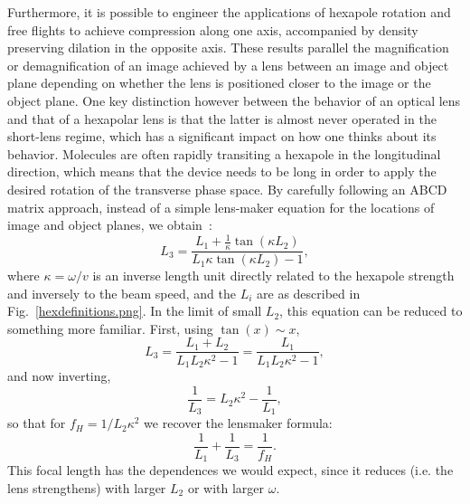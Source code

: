 Furthermore, it is possible to engineer the applications of hexapole rotation and free flights to achieve compression along one axis, accompanied by density preserving dilation in the opposite axis.
These results parallel the magnification or demagnification of an image achieved by a lens between an image and object plane depending on whether the lens is positioned closer to the image or the object plane.
One key distinction however between the behavior of an optical lens and that of a hexapolar lens is that the latter is almost never operated in the short-lens regime, which has a significant impact on how one thinks about its behavior.
Molecules are often rapidly transiting a hexapole in the longitudinal direction, which means that the device needs to be long in order to apply the desired rotation of the transverse phase space.
By carefully following an ABCD matrix approach, instead of a simple lens-maker equation for the locations of image and object planes, we obtain~\citep[Eq.~9]{Kirste2013}:
\begin{equation}
L_3 = \frac{L_1+\frac{1}{\kappa}\tan(\kappa L_2)}{L_1\kappa\tan(\kappa L_2)-1},
\end{equation}
where $\kappa=\omega/v$ is an inverse length unit directly related to the hexapole strength and inversely to the beam speed, and the $L_i$ are as described in Fig.~\ref{hexdefinitions.png}.
In the limit of small $L_2$, this equation can be reduced to something more familiar.
First, using $\tan(x)\sim x$,
\begin{equation}
L_3 = \frac{L_1+L_2}{L_1L_2\kappa^2-1}= \frac{L_1}{L_1L_2\kappa^2-1},
\end{equation}
and now inverting,
\begin{equation}
\frac{1}{L_3} = L_2\kappa^2 - \frac{1}{L_1},
\end{equation}
so that for $f_H=1/L_2\kappa^2$ we recover the lensmaker formula:
\begin{equation}
\frac{1}{L_1}+\frac{1}{L_3}=\frac{1}{f_H}.
\end{equation}
This focal length has the dependences we would expect, since it reduces (i.e. the lens strengthens) with larger $L_2$ or with larger $\omega$.


